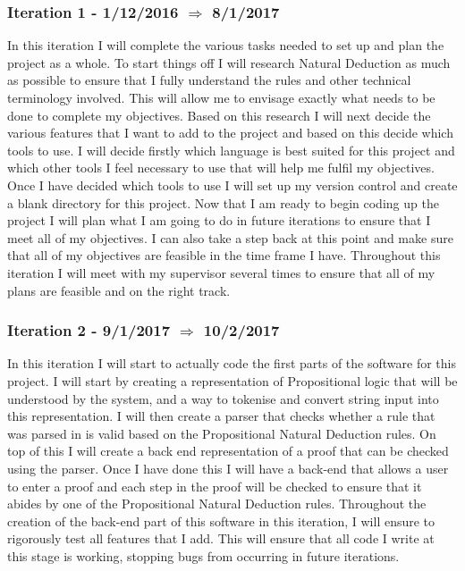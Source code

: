 \subsubsection{Iteration 1 - 1/12/2016 $\Rightarrow$ 8/1/2017}

In this iteration I will complete the various tasks needed to set up and plan the project as a whole. To start things off I will research Natural Deduction as much as possible to ensure that I fully understand the rules and other technical terminology involved. This will allow me to envisage exactly what needs to be done to complete my objectives. Based on this research I will next decide the various features that I want to add to the project and based on this decide which tools to use. I will decide firstly which language is best suited for this project and which other tools I feel necessary to use that will help me fulfil my objectives. Once I have decided which tools to use I will set up my version control and create a blank directory for this project. Now that I am ready to begin coding up the project I will plan what I am going to do in future iterations to ensure that I meet all of my objectives. I can also take a step back at this point and make sure that all of my objectives are feasible in the time frame I have. Throughout this iteration I will meet with my supervisor several times to ensure that all of my plans are feasible and on the right track.

\subsubsection{Iteration 2 - 9/1/2017 $\Rightarrow$ 10/2/2017}

In this iteration I will start to actually code the first parts of the software for this project. I will start by creating a representation of Propositional logic that will be understood by the system, and a way to tokenise and convert string input into this representation. I will then create a parser that checks whether a rule that was parsed in is valid based on the Propositional Natural Deduction rules. On top of this I will create a back end representation of a proof that can be checked using the parser. Once I have done this I will have a back-end that allows a user to enter a proof and each step in the proof will be checked to ensure that it abides by one of the Propositional Natural Deduction rules. Throughout the creation of the back-end part of this software in this iteration, I will ensure to rigorously test all features that I add. This will ensure that all code I write at this stage is working, stopping bugs from occurring in future iterations. 

